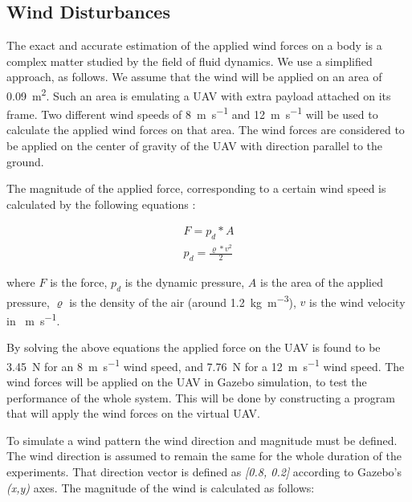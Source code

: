 \documentclass[conference]{IEEEtran}
\begin{document}
\subsection{Wind Disturbances}
\label{sec:WindDisturbances}

The exact and accurate estimation of the applied wind forces on a body
is a complex matter studied by the field of fluid dynamics. We use a
simplified approach, as follows. We assume that the wind will be
applied on an area of \SI{0.09}{\m^2}. Such an area is emulating a UAV
with extra payload attached on its frame. Two different wind speeds of
\SI{8}{\m \per \s} and \SI{12}{\m \per \s} will be used to calculate the applied wind forces
on that area. The wind forces are considered to be applied on the
center of gravity of the UAV with direction parallel to the ground.

The magnitude of the applied force, corresponding to a certain wind
speed is calculated by the following equations
\cite{Dynamic_pressure_NASA,anderson2010fundamentals}:

\begin{equation}
    \begin{array}{l}
         F = p_{d}  * A  \\
         p_{d} = \frac{\varrho * v^2}{2} 
    \end{array}
\end{equation}

\noindent where $F$ is the force, \(p_{d}\) is the dynamic pressure, \(A\) is
the area of the applied pressure, \(\varrho\) is the density of the
air (around \SI{1.2}{\kg \per \m^3}), \(v\) is the wind velocity in \SI{}{\m \per \s}.

By solving the above equations the applied force on the UAV is found
to be \SI{3.45}{\newton} for an \SI{8}{\m \per \s} wind speed, and \SI{7.76}{\newton} for a \SI{12}{\m \per \s}
wind speed. The wind forces will be applied on the UAV in Gazebo
simulation, to test the performance of the whole system. This will be
done by constructing a program that will apply the wind forces on the
virtual UAV.

To simulate a wind pattern the wind direction and magnitude must be
defined. The wind direction is assumed to remain the same for the
whole duration of the experiments. That direction vector is defined as
\emph{[0.8, 0.2]} according to Gazebo's \emph{(x,y)} axes.
%
The magnitude of the wind is calculated as follows: %
\end{document}
